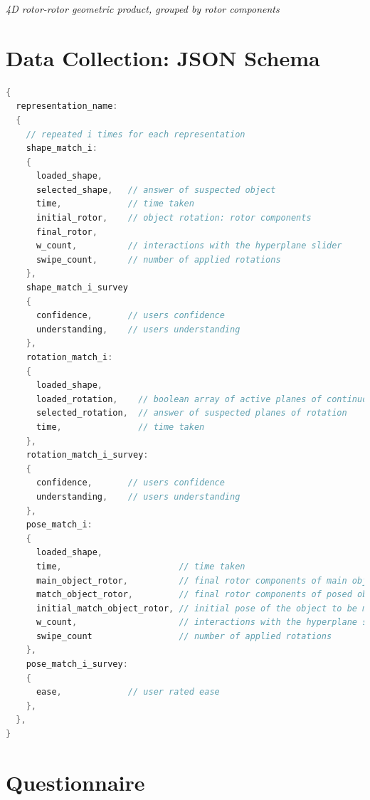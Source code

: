 \documentclass{l4proj}
\begin{document}
\begin{appendices}
\textit{4D rotor-rotor geometric product, grouped by rotor components}

\pagebreak
\section{Data Collection: JSON Schema}

\begin{lstlisting}[language=java, caption={
  JSON schema for data collection
}, label=lst:json]
{
  representation_name:
  {
    // repeated i times for each representation
    shape_match_i: 
    {
      loaded_shape,
      selected_shape,   // answer of suspected object
      time,             // time taken
      initial_rotor,    // object rotation: rotor components
      final_rotor,
      w_count,          // interactions with the hyperplane slider
      swipe_count,      // number of applied rotations
    },
    shape_match_i_survey
    {
      confidence,       // users confidence
      understanding,    // users understanding
    },
    rotation_match_i:
    {
      loaded_shape,
      loaded_rotation,    // boolean array of active planes of continuous rotation
      selected_rotation,  // answer of suspected planes of rotation
      time,               // time taken
    },
    rotation_match_i_survey:
    {
      confidence,       // users confidence
      understanding,    // users understanding
    },
    pose_match_i:
    {
      loaded_shape,
      time,                       // time taken
      main_object_rotor,          // final rotor components of main object
      match_object_rotor,         // final rotor components of posed object to be matched
      initial_match_object_rotor, // initial pose of the object to be matched
      w_count,                    // interactions with the hyperplane slider
      swipe_count                 // number of applied rotations
    },
    pose_match_i_survey:
    {
      ease,             // user rated ease
    },
  },
}
\end{lstlisting}

\section{Questionnaire}\enlargethispage{5\baselineskip}
\label{questionnaire}


\end{appendices}
\end{document}
